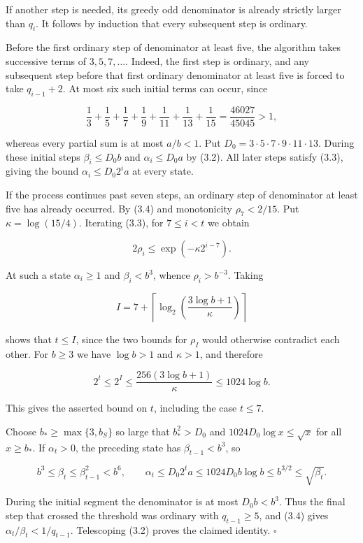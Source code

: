 \documentclass[11pt,a4paper]{article}
\begin{document}
If another step is needed, its greedy odd denominator is already strictly larger than $q_i$. It follows by induction that every subsequent step is ordinary.

Before the first ordinary step of denominator at least five, the algorithm takes successive terms of $3,5,7,\ldots$. Indeed, the first step is ordinary, and any subsequent step before that first ordinary denominator at least five is forced to take $q_{i-1}+2$. At most six such initial terms can occur, since

\[
\frac13+\frac15+\frac17+\frac19+\frac1{11}+\frac1{13}+\frac1{15}
 =\frac{46027}{45045}>1,
\]

whereas every partial sum is at most $a/b<1$. Put $D_0=3\cdot5\cdot7\cdot9\cdot11\cdot13$. During these initial steps $\beta_i\le D_0b$ and $\alpha_i\le D_0a$ by (3.2). All later steps satisfy (3.3), giving the bound $\alpha_i\le D_0 2^i a$ at every state.

If the process continues past seven steps, an ordinary step of denominator at least five has already occurred. By (3.4) and monotonicity $\rho_7<2/15$. Put $\kappa=\log(15/4)$. Iterating (3.3), for $7\le i<t$ we obtain

\[
2\rho_i\le\exp(-\kappa 2^{i-7}).
\]

At such a state $\alpha_i\ge1$ and $\beta_i<b^3$, whence $\rho_i>b^{-3}$. Taking

\[
I=7+\left\lceil\log_2\!\left(\frac{3\log b+1}{\kappa}\right)\right\rceil
\]

shows that $t\le I$, since the two bounds for $\rho_I$ would otherwise contradict each other. For $b\ge3$ we have $\log b>1$ and $\kappa>1$, and therefore

\[
2^t\le 2^I\le \frac{256(3\log b+1)}{\kappa}\le1024\log b.
\]

This gives the asserted bound on $t$, including the case $t\le7$.

Choose $b_*\ge\max\{3,b_S\}$ so large that $b_*^2>D_0$ and $1024D_0\log x\le\sqrt x$ for all $x\ge b_*$. If $\alpha_t>0$, the preceding state has $\beta_{t-1}<b^3$, so

\[
b^3\le\beta_t\le\beta_{t-1}^2<b^6,\qquad
 \alpha_t\le D_0 2^ta\le1024D_0 b\log b\le b^{3/2}\le\sqrt{\beta_t}.
\]

During the initial segment the denominator is at most $D_0b<b^3$. Thus the final step that crossed the threshold was ordinary with $q_{t-1}\ge5$, and (3.4) gives $\alpha_t/\beta_t<1/q_{t-1}$. Telescoping (3.2) proves the claimed identity. $\square$
\end{document}
